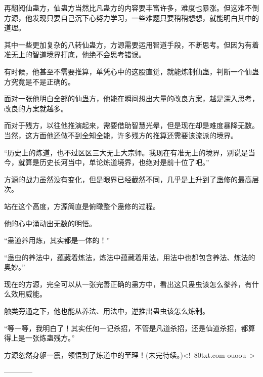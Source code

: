 \begin{this_body}
再翻阅仙蛊方，仙蛊方当然比凡蛊方的内容要丰富许多，难度也暴涨。但这难不倒方源，他发现只要自己沉下心努力学习，一些难题只要稍稍想想，就能明白其中的道理。

其中一些更加复杂的八转仙蛊方，方源需要运用智道手段，不断思考。但因为有着准无上的智道境界打底，他绝不会思考错误。

有时候，他甚至不需要推算，单凭心中的这股直觉，就能炼制仙蛊，判断一个仙蛊方究竟是不是正确的。

面对一张他明白全部的仙蛊方，他能在瞬间想出大量的改良方案，越是深入思考，改良的方案就越多。

而对于残方，以往他推演起来，需要借助智慧光晕，但是现在却是难度暴降无数。当然，这方面他还做不到全知全能，许多残方的推算还需要该流派的境界。

“历史上的炼道，也不过区区三大无上大宗师。我现在有准无上的境界，别说是当今，就算是历史长河当中，单论炼道境界，也绝对是前十位了吧。”

方源的战力虽然没有变化，但是眼界已经截然不同，几乎是上升到了蛊修的最高层次。

站在这个高度，方源简直是俯瞰整个蛊修的过程。

他的心中涌动出无数的明悟。

“蛊道养用炼，其实都是一体的！”

“蛊虫的养法中，蕴藏着炼法，炼法中蕴藏着用法，用法中也都包含养法、炼法的奥妙。”

现在的方源，完全可以从一张完善正确的蛊方中，看出这只蛊虫该怎么豢养，有什么效用威能。

触类旁通之下，他也能从养法、用法中，逆推出蛊虫该怎么炼制。

“等一等，我明白了！其实任何一记杀招，不管是凡道杀招，还是仙道杀招，都算得上是一张炼蛊残方。”

方源忽然身躯一震，领悟到了炼道中的至理！(未完待续。)<!--80txt.com-ouoou-->

------------

\end{this_body}

